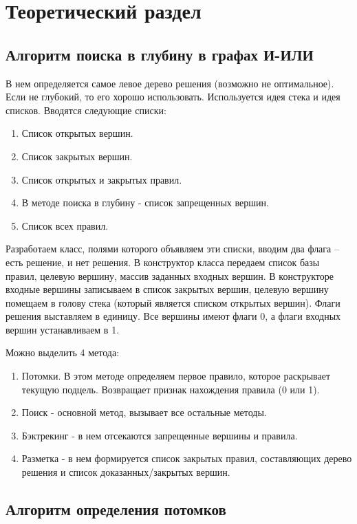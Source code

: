 \chapter{Теоретический раздел}

\section{Алгоритм поиска в глубину в графах И-ИЛИ}

В нем определяется самое левое дерево решения (возможно не оптимальное). Если не глубокий, то его хорошо использовать. Используется идея стека и идея списков. Вводятся следующие списки:

\begin{enumerate}
    \item Список открытых вершин.
    \item Список закрытых вершин.
    \item Список открытых и закрытых правил.
    \item В методе поиска в глубину - список запрещенных вершин.
    \item Список всех правил.
\end{enumerate}

Разработаем класс, полями которого объявляем эти списки, вводим два флага -- есть решение,  и нет решения. В конструктор класса передаем список базы правил, целевую вершину, массив заданных входных вершин. В конструкторе входные вершины записываем в список закрытых вершин, целевую вершину помещаем в голову стека (который является списком открытых вершин). Флаги решения выставляем в единицу. Все вершины имеют флаги 0, а флаги входных вершин устанавливаем в 1.

Можно выделить 4 метода:

\begin{enumerate}
    \item Потомки. В этом методе определяем первое правило, которое раскрывает текущую подцель. Возвращает признак нахождения правила (0 или 1).
    \item Поиск - основной метод, вызывает все остальные методы.
    \item Бэктрекинг - в нем отсекаются запрещенные вершины и правила.
    \item Разметка - в нем формируется список закрытых правил, составляющих дерево решения и список доказанных/закрытых вершин.
\end{enumerate}
    
\section{Алгоритм определения потомков}

